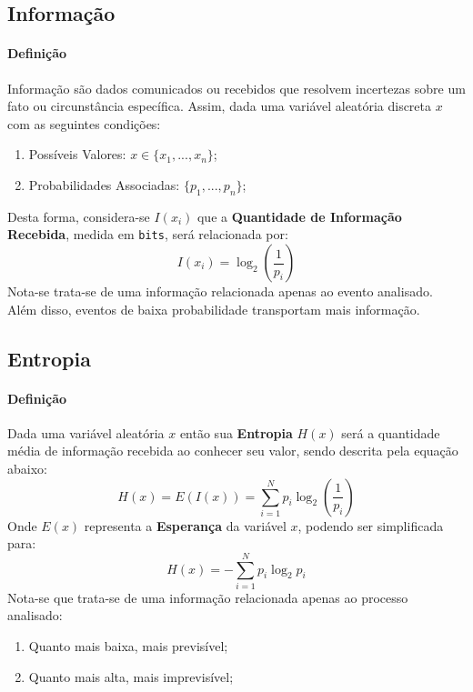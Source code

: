 \documentclass{article}
\begin{document}
\begin{multicols}{2}
    \raggedcolumns

    \subsection{Informação}
        \paragraph{Definição}Informação são dados comunicados ou recebidos que resolvem incertezas sobre um fato ou circunstância específica. Assim, dada uma variável aleatória discreta $x$ com as seguintes condições:
            \begin{enumerate}[noitemsep]
                \item Possíveis Valores: $x \in \{x_{1},...,x_{n}\}$;
                \item Probabilidades Associadas: $\{p_{1},...,p_{n}\}$;
            \end{enumerate}
        Desta forma, considera-se $I(x_{i})$ que a \textbf{Quantidade de Informação Recebida}, medida em \texttt{bits}, será relacionada por:
            \begin{equation}
                \boxed{
                    I(x_{i}) = \log_{2}\left(\frac{1}{p_{i}}\right)
                }
            \end{equation}
        Nota-se trata-se de uma informação relacionada apenas ao evento analisado. Além disso, eventos de baixa probabilidade transportam mais informação.

    \columnbreak

    \subsection{Entropia}
        \paragraph{Definição}Dada uma variável aleatória $x$ então sua \textbf{Entropia} $H(x)$ será a quantidade média de informação recebida ao conhecer seu valor, sendo descrita pela equação abaixo:
            \begin{equation*}
                H(x) = E(I(x)) = \sum_{i=1}^{N}p_{i}\log_{2}\left(\frac{1}{p_{i}}\right)
            \end{equation*}
        Onde $E(x)$ representa a \textbf{Esperança} da variável $x$, podendo ser simplificada para:
            \begin{equation}
                \boxed{
                    H(x) = -\sum_{i=1}^{N}p_{i}\log_{2}p_{i}
                }
            \end{equation}
        Nota-se que trata-se de uma informação relacionada apenas ao processo analisado:
            \begin{enumerate}[noitemsep]
                \item Quanto mais baixa, mais previsível; 
                \item Quanto mais alta, mais imprevisível; 
            \end{enumerate}
\end{multicols}
        
\end{document}
